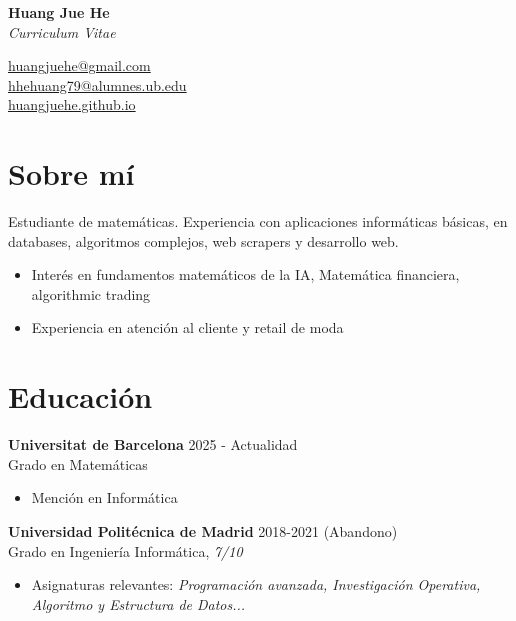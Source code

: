\documentclass[11pt,a4paper]{article}
\newcommand{\link}[2]{\href{#1}{#2}}
\begin{document}
\sloppy

\noindent
\begin{minipage}[t]{0.5\textwidth}
    \Huge \textbf{Huang Jue He} \\[6pt]
    \large \textit{Curriculum Vitae}
\end{minipage}
\begin{minipage}[t]{0.5\textwidth}
    \raggedleft
    \link{mailto:huangjuehe@gmail.com}{huangjuehe@gmail.com} \\
    \link{mailto:hhehuang79@alumnes.ub.edu}{hhehuang79@alumnes.ub.edu} \\
    \link{https://huangjuehe.github.io/}{huangjuehe.github.io} \\
\end{minipage}

\section*{Sobre mí}
Estudiante de matemáticas. Experiencia con aplicaciones informáticas básicas, en databases, algoritmos complejos, web scrapers y desarrollo web.
\begin{itemize}[label=-]
    \item Interés en fundamentos matemáticos de la IA, Matemática financiera, algorithmic trading
    \item Experiencia en atención al cliente y retail de moda
\end{itemize}

\section*{Educación}

\textbf{Universitat de Barcelona} \hfill 2025 - Actualidad \\
Grado en Matemáticas
\begin{itemize}[label=-]
    \item Mención en Informática
\end{itemize}

\noindent
\textbf{Universidad Politécnica de Madrid} \hfill 2018-2021 (Abandono) \\
Grado en Ingeniería Informática, \textit{7/10}
\begin{itemize}[label=-]
    \item Asignaturas relevantes: \textit{Programación avanzada, Investigación Operativa, Algoritmo y Estructura de Datos...}
\end{itemize}
\end{document}
